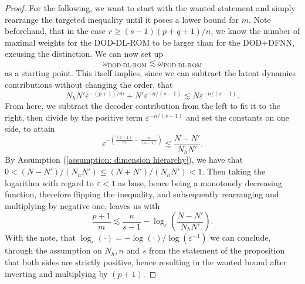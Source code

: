 \begin{proof}
    For the following, we want to start with the wanted statement and simply rearrange the targeted inequality
    until it poses a lower bound for $m$. Note beforehand, that in the case $r \geq (s-1)(p+q+1)/n$,
    we know the number of maximal weights for the DOD-DL-ROM to be larger than for the DOD+DFNN, excusing
    the distinction.
    We can now set up
    \begin{equation*}
        \omega_\text{DOD-DL-ROM} \lesssim \omega_\text{POD-DL-ROM}
    \end{equation*}
    as a starting point. This itself implies, since we can subtract the latent dynamics contributions
    without changing the order, that
    \begin{equation*}
        N_h N' \varepsilon^{-(p+1)/m} + 
        N' \varepsilon^{-n/(s-1)} \lesssim N \varepsilon^{-n/(s-1)}.
    \end{equation*}
    From here, we subtract the decoder contribution from the left to fit it to the right, then divide by 
    the positive term $\varepsilon^{-n/(s-1)}$ and set the constants on one side, to attain
    \begin{equation*}
        \varepsilon^{-\left(\frac{(p+1)}{m} - \frac{n}{(s-1)}\right)} \lesssim \frac{N - N'}{N_h N'}.
    \end{equation*}
    By Assumption (\ref{assumption: dimension hierarchy}),
    we have that $0 < (N-N')/(N_hN') \leq (N + N')/(N_hN') < 1$. 
    Then taking the logarithm with regard to $\varepsilon < 1$ as base, hence being 
    a monotonely decreasing function, therefore 
    flipping the inequality, 
    and subsequently rearranging and multiplying by negative one, 
    leaves us with
    \begin{equation*}
        \frac{p+1}{m} \lesssim \frac{n}{s-1} - \log_\varepsilon\left( \frac{N - N'}{N_hN'} \right).
    \end{equation*}
    With the note, that $\log_\varepsilon(\cdot) = -\log(\cdot)/\log(\varepsilon^{-1})$ 
    we can conclude, through the assumption on $N_h, n$ and $s$ from
    the statement of the proposition that both sides are strictly positive,
    hence resulting in the wanted bound after inverting and multiplying by $(p+1)$. 


\end{proof}
